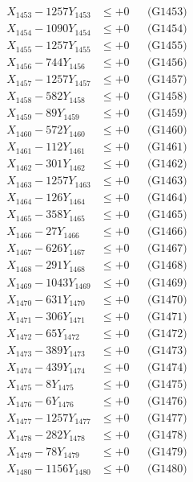 \documentclass[a4paper,10pt]{article}
\begin{document}
{\begin{align}
X_{1453} - 1257Y_{1453} &\leq +0 && \text{(G1453)} \\
X_{1454} - 1090Y_{1454} &\leq +0 && \text{(G1454)} \\
X_{1455} - 1257Y_{1455} &\leq +0 && \text{(G1455)} \\
X_{1456} - 744Y_{1456} &\leq +0 && \text{(G1456)} \\
X_{1457} - 1257Y_{1457} &\leq +0 && \text{(G1457)} \\
X_{1458} - 582Y_{1458} &\leq +0 && \text{(G1458)} \\
X_{1459} - 89Y_{1459} &\leq +0 && \text{(G1459)} \\
X_{1460} - 572Y_{1460} &\leq +0 && \text{(G1460)} \\
\allowbreak
X_{1461} - 112Y_{1461} &\leq +0 && \text{(G1461)} \\
X_{1462} - 301Y_{1462} &\leq +0 && \text{(G1462)} \\
X_{1463} - 1257Y_{1463} &\leq +0 && \text{(G1463)} \\
X_{1464} - 126Y_{1464} &\leq +0 && \text{(G1464)} \\
X_{1465} - 358Y_{1465} &\leq +0 && \text{(G1465)} \\
X_{1466} - 27Y_{1466} &\leq +0 && \text{(G1466)} \\
X_{1467} - 626Y_{1467} &\leq +0 && \text{(G1467)} \\
X_{1468} - 291Y_{1468} &\leq +0 && \text{(G1468)} \\
X_{1469} - 1043Y_{1469} &\leq +0 && \text{(G1469)} \\
X_{1470} - 631Y_{1470} &\leq +0 && \text{(G1470)} \\
\allowbreak
X_{1471} - 306Y_{1471} &\leq +0 && \text{(G1471)} \\
X_{1472} - 65Y_{1472} &\leq +0 && \text{(G1472)} \\
X_{1473} - 389Y_{1473} &\leq +0 && \text{(G1473)} \\
X_{1474} - 439Y_{1474} &\leq +0 && \text{(G1474)} \\
X_{1475} - 8Y_{1475} &\leq +0 && \text{(G1475)} \\
X_{1476} - 6Y_{1476} &\leq +0 && \text{(G1476)} \\
X_{1477} - 1257Y_{1477} &\leq +0 && \text{(G1477)} \\
X_{1478} - 282Y_{1478} &\leq +0 && \text{(G1478)} \\
X_{1479} - 78Y_{1479} &\leq +0 && \text{(G1479)} \\
X_{1480} - 1156Y_{1480} &\leq +0 && \text{(G1480)} \\

\end{align}}
\end{document}

